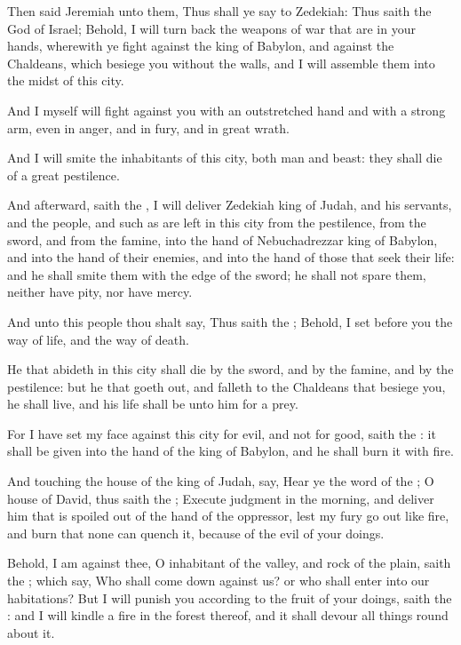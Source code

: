 \verse Then said Jeremiah unto them, Thus shall ye say to Zedekiah: \verse Thus saith the \LORD God of Israel; Behold, I will turn back the weapons of war that are in your hands, wherewith ye fight against the king of Babylon, and against the Chaldeans, which besiege you without the walls, and I will assemble them into the midst of this city.

\verse And I myself will fight against you with an outstretched hand and with a strong arm, even in anger, and in fury, and in great wrath.

\verse And I will smite the inhabitants of this city, both man and beast: they shall die of a great pestilence.

\verse And afterward, saith the \LORD, I will deliver Zedekiah king of Judah, and his servants, and the people, and such as are left in this city from the pestilence, from the sword, and from the famine, into the hand of Nebuchadrezzar king of Babylon, and into the hand of their enemies, and into the hand of those that seek their life: and he shall smite them with the edge of the sword; he shall not spare them, neither have pity, nor have mercy.

\verse And unto this people thou shalt say, Thus saith the \LORD; Behold, I set before you the way of life, and the way of death.

\verse He that abideth in this city shall die by the sword, and by the famine, and by the pestilence: but he that goeth out, and falleth to the Chaldeans that besiege you, he shall live, and his life shall be unto him for a prey.

\verse For I have set my face against this city for evil, and not for good, saith the \LORD: it shall be given into the hand of the king of Babylon, and he shall burn it with fire.

\verse And touching the house of the king of Judah, say, Hear ye the word of the \LORD; \verse O house of David, thus saith the \LORD; Execute judgment in the morning, and deliver him that is spoiled out of the hand of the oppressor, lest my fury go out like fire, and burn that none can quench it, because of the evil of your doings.

\verse Behold, I am against thee, O inhabitant of the valley, and rock of the plain, saith the \LORD; which say, Who shall come down against us? or who shall enter into our habitations?  \verse But I will punish you according to the fruit of your doings, saith the \LORD: and I will kindle a fire in the forest thereof, and it shall devour all things round about it.


